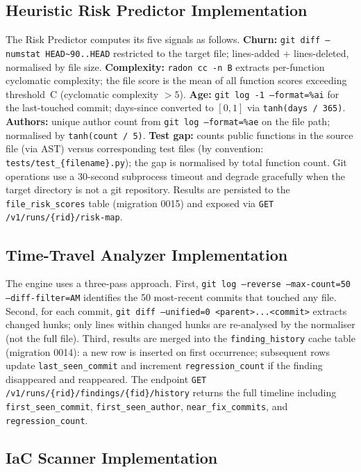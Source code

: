 \subsection{Heuristic Risk Predictor Implementation}

The Risk Predictor computes its five signals as follows. \textbf{Churn:} \texttt{git diff --numstat HEAD\textasciitilde{}90..HEAD} restricted to the target file; lines-added + lines-deleted, normalised by file size. \textbf{Complexity:} \texttt{radon cc -n B} extracts per-function cyclomatic complexity; the file score is the mean of all function scores exceeding threshold~C (cyclomatic complexity $> 5$). \textbf{Age:} \texttt{git log -1 --format=\%ai} for the last-touched commit; days-since converted to $[0,1]$ via \texttt{tanh(days / 365)}. \textbf{Authors:} unique author count from \texttt{git log --format=\%ae} on the file path; normalised by \texttt{tanh(count / 5)}. \textbf{Test gap:} counts public functions in the source file (via AST) versus corresponding test files (by convention: \texttt{tests/test\_\{filename\}.py}); the gap is normalised by total function count. Git operations use a 30-second subprocess timeout and degrade gracefully when the target directory is not a git repository. Results are persisted to the \texttt{file\_risk\_scores} table (migration 0015) and exposed via \texttt{GET /v1/runs/\{rid\}/risk-map}.

\subsection{Time-Travel Analyzer Implementation}

The engine uses a three-pass approach. First, \texttt{git log --reverse --max-count=50 --diff-filter=AM} identifies the 50 most-recent commits that touched any file. Second, for each commit, \texttt{git diff --unified=0 <parent>...<commit>} extracts changed hunks; only lines within changed hunks are re-analysed by the normaliser (not the full file). Third, results are merged into the \texttt{finding\_history} cache table (migration 0014): a new row is inserted on first occurrence; subsequent rows update \texttt{last\_seen\_commit} and increment \texttt{regression\_count} if the finding disappeared and reappeared. The endpoint \texttt{GET /v1/runs/\{rid\}/findings/\{fid\}/history} returns the full timeline including \texttt{first\_seen\_commit}, \texttt{first\_seen\_author}, \texttt{near\_fix\_commits}, and \texttt{regression\_count}.

\subsection{IaC Scanner Implementation}

